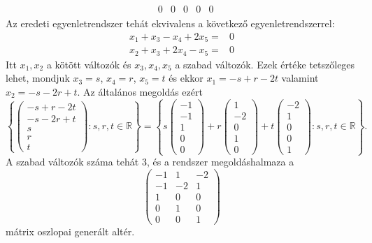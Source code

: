 \documentclass[a4paper, showtrims]{memoir}
\theoremstyle{plain}
\theoremstyle{remark}
\theoremstyle{definition}
\begin{document}
\begin{enumerate}
\begin{multline*}
\begin{array}{r|rrrrr}
			          & 0   & 0   & 0   & 0   & 0
		      \end{array}
	      \end{multline*}
	      Az eredeti egyenletrendszer tehát ekvivalens a következő egyenletrendszerrel:
	      \[
		      \begin{array}{rl}
			      x_1+x_3-x_4+2x_5= & 0 \\
			      x_2+x_3+2x_4-x_5= & 0
		      \end{array}
	      \]
	      Itt $x_1,x_2$ a kötött változók és $x_3,x_4,x_5$ a szabad változók.
	      Ezek értéke tetszőleges lehet, mondjuk $x_3=s$, $x_4=r$, $x_5=t$ és ekkor
	      $x_1=-s+r-2t$ valamint $x_2=-s-2r+t$.
	      Az általános megoldás ezért
	      \[
		      \left\{
		      \begin{pmatrix}
			      -s+r-2t \\
			      -s-2r+t \\
			      s       \\
			      r       \\
			      t
		      \end{pmatrix}
		      :s,r,t\in\mathbb{R}
		      \right\}
		      =
		      \left\{ s
		      \begin{pmatrix}
			      -1 \\-1\\1\\0\\0
		      \end{pmatrix}
		      +
		      r
		      \begin{pmatrix}
			      1 \\-2\\0\\1\\0
		      \end{pmatrix}
		      +
		      t
		      \begin{pmatrix}
			      -2 \\1\\0\\0\\1
		      \end{pmatrix}
		      :s,r,t\in\mathbb{R}
		      \right\}.
	      \]
	      A szabad változók száma tehát $3$,
	      és a rendszer megoldáshalmaza a
	      \[
		      \begin{pmatrix}
			      -1 & 1  & -2 \\
			      -1 & -2 & 1  \\
			      1  & 0  & 0  \\
			      0  & 1  & 0  \\
			      0  & 0  & 1
		      \end{pmatrix}
	      \]
	      mátrix oszlopai generált altér.
\end{enumerate}
\end{document}

